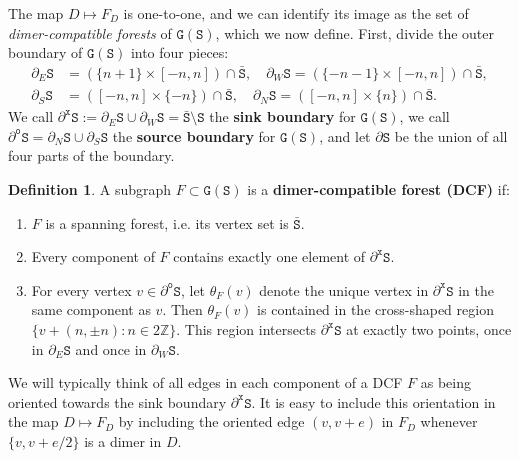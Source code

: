 \documentclass[11pt,twoside]{amsart}
\theoremstyle{plain}
\numberwithin{quest}{section}
\theoremstyle{remark}
\numberwithin{rem}{section}
\theoremstyle{definition}
\newtheorem{defn}[rem]{Definition}
\newcommand{\Z}{\mathbb{Z}}
\renewcommand{\tt}[1]{{\mathtt{#1}}}
\begin{document}
	The map $D \mapsto F_D$ is one-to-one, and we can identify its image as the set of \textit{dimer-compatible forests} of $\tt{G}(\mathtt{S})$, which we now define. First, divide the outer boundary of $\tt{G}(\mathtt{S})$ into four pieces:
	\begin{equation}
		\label{E:cardinal-boundaries}
		\begin{split}
			\partial_E \tt{S} &= (\{n + 1\} \times [-n, n]) \cap \tt{\bar S}, \quad 	\partial_W \tt{S} =  (\{-n - 1\} \times [-n, n]) \cap \tt{\bar S}, \\
			\partial_S \tt{S} &= ([-n, n] \times \{-n\}) \cap \tt{\bar S}, \quad 	\partial_N \tt{S}=  ([-n, n] \times \{n\}) \cap \tt{\bar S}.
		\end{split}
	\end{equation}
	We call $\partial^{\tt{x}} \tt{S} := \partial_E \tt{S} \cup \partial_W\tt{S} = \tt{\bar S} \setminus \tt{S}$ the \textbf{sink boundary} for $\tt{G}(\tt{S})$, we call $\partial^{\tt{o}} \tt{S} = \partial_N \tt{S} \cup \partial_S \tt{S}$ the \textbf{source boundary} for $\tt{G}(\tt{S})$, and let $\partial \tt{S}$ be the union of all four parts of the boundary.  
	\begin{defn}
		\label{D:dc-forest}
		A subgraph $F \subset \tt{G}(\mathtt{S})$ is a \textbf{dimer-compatible forest (DCF)} if:
		\begin{enumerate}[label=(\roman*)]
			\item $F$ is a spanning forest, i.e. its vertex set is $\tt{\bar S}$.
			\item Every component of $F$ contains exactly one element of $\partial^{\tt{x}} \mathtt{S}$.
			\item For every vertex $v \in \partial^{\tt{o}} \mathtt{S}$, let $\theta_F(v)$ denote the unique vertex in $\partial^{\tt{x}} \mathtt{S}$ in the same component as $v$. Then $\theta_F(v)$ is contained in the cross-shaped region $\{v + (n, \pm n) : n \in 2 \Z \}$. This region intersects $\partial^\tt{x} \tt{S}$ at exactly two points, once in $\partial_E \tt{S}$ and once in $\partial_W \tt{S}$.
		\end{enumerate} 
	\end{defn}

	We will typically think of all edges in each component of a DCF $F$ as being oriented towards the sink boundary  $\partial^{\tt{x}} \tt{S}$. It is easy to include this orientation in the map $D \mapsto F_D$ by including the oriented edge $(v, v + e)$ in $F_D$ whenever $\{v, v + e/2\}$ is a dimer in $D$. 
\end{document}
